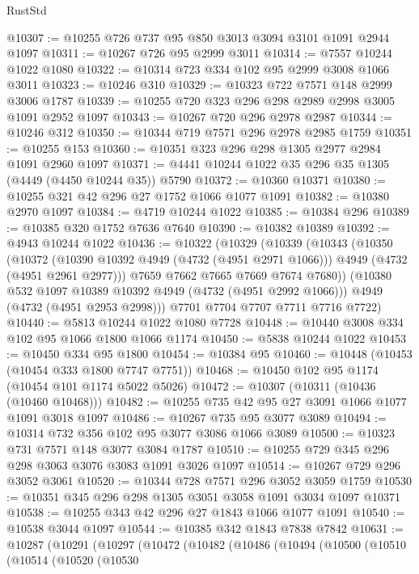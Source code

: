 \begin{lexlean}{RustStd}
\begin{coremodule}
{\begin{coremodule}
{{{{{{{{{{{{{{@10307 := @10255 @726 @737 @95 @850 @3013 @3094 @3101 @1091 @2944 @1097
@10311 := @10267 @726 @95 @2999 @3011
@10314 := @7557 @10244 @1022 @1080
@10322 := @10314 @723 @334 @102 @95 @2999 @3008 @1066 @3011
@10323 := @10246 @310
@10329 := @10323 @722 @7571 @148 @2999 @3006 @1787
@10339 := @10255 @720 @323 @296 @298 @2989 @2998 @3005 @1091 @2952 @1097
@10343 := @10267 @720 @296 @2978 @2987
@10344 := @10246 @312
@10350 := @10344 @719 @7571 @296 @2978 @2985 @1759
@10351 := @10255 @153
@10360 := @10351 @323 @296 @298 @1305 @2977 @2984 @1091 @2960 @1097
@10371 := @4441 @10244 @1022 @35 @296 @35 @1305 (@4449 (@4450 @10244 @35)) @5790
@10372 := @10360 @10371
@10380 := @10255 @321 @42 @296 @27 @1752 @1066 @1077 @1091
@10382 := @10380 @2970 @1097
@10384 := @4719 @10244 @1022
@10385 := @10384 @296
@10389 := @10385 @320 @1752 @7636 @7640
@10390 := @10382 @10389
@10392 := @4943 @10244 @1022
@10436 := @10322
    (@10329
      (@10339
        (@10343
          (@10350
            (@10372
              (@10390 @10392 @4949 (@4732 (@4951 @2971 @1066)))
              @4949
              (@4732 (@4951 @2961 @2977)))
            @7659
            @7662
            @7665
            @7669
            @7674
            @7680))
        (@10380 @532 @1097 @10389 @10392 @4949 (@4732 (@4951 @2992 @1066)))
        @4949
        (@4732 (@4951 @2953 @2998)))
      @7701
      @7704
      @7707
      @7711
      @7716
      @7722)
@10440 := @5813 @10244 @1022 @1080 @7728
@10448 := @10440 @3008 @334 @102 @95 @1066 @1800 @1066 @1174
@10450 := @5838 @10244 @1022
@10453 := @10450 @334 @95 @1800
@10454 := @10384 @95
@10460 := @10448 (@10453 (@10454 @333 @1800 @7747 @7751))
@10468 := @10450 @102 @95 @1174 (@10454 @101 @1174 @5022 @5026)
@10472 := @10307 (@10311 (@10436 (@10460 @10468)))
@10482 := @10255 @735 @42 @95 @27 @3091 @1066 @1077 @1091 @3018 @1097
@10486 := @10267 @735 @95 @3077 @3089
@10494 := @10314 @732 @356 @102 @95 @3077 @3086 @1066 @3089
@10500 := @10323 @731 @7571 @148 @3077 @3084 @1787
@10510 := @10255 @729 @345 @296 @298 @3063 @3076 @3083 @1091 @3026 @1097
@10514 := @10267 @729 @296 @3052 @3061
@10520 := @10344 @728 @7571 @296 @3052 @3059 @1759
@10530 := @10351 @345 @296 @298 @1305 @3051 @3058 @1091 @3034 @1097 @10371
@10538 := @10255 @343 @42 @296 @27 @1843 @1066 @1077 @1091
@10540 := @10538 @3044 @1097
@10544 := @10385 @342 @1843 @7838 @7842
@10631 := @10287
    (@10291
      (@10297
        (@10472
          (@10482
            (@10486
              (@10494
                (@10500
                  (@10510
                    (@10514
                      (@10520
                        (@10530
}}}}}}}}}}}}}}
\end{coremodule}}
\end{coremodule}
\end{lexlean}
